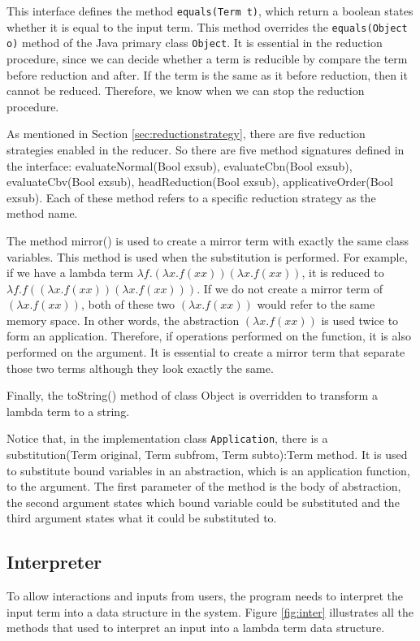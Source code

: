 This interface defines the method \verb|equals(Term t)|, which return a boolean states whether it is equal to the input term. This method overrides the \verb|equals(Object o)| method of the Java primary class \verb|Object|. It is essential in the reduction procedure, since we can decide whether a term is reducible by compare the term before reduction and after. If the term is the same as it before reduction, then it cannot be reduced. Therefore, we know when we can stop the reduction procedure.  

As mentioned in Section \ref{sec:reductionstrategy}, there are five reduction strategies enabled in the reducer. So there are five method signatures defined in the interface: \textsf{evaluateNormal(Bool exsub), evaluateCbn(Bool exsub), evaluateCbv(Bool exsub), headReduction(Bool exsub), applicativeOrder(Bool exsub)}. Each of these method refers to a specific reduction strategy as the method name. 

The method \textsf{mirror()} is used to create a mirror term with exactly the same class variables. This method is used when the substitution is performed. For example, if we have a lambda term $\lambda f.(\lambda x.f(xx))(\lambda x.f(xx))$, it is reduced to $\lambda f.f((\lambda x.f(xx))(\lambda x.f(xx)))$. If we do not create a mirror term of $(\lambda x.f(xx))$, both of these two $(\lambda x.f(xx))$ would refer to the same memory space. In other words, the abstraction $(\lambda x.f(xx))$ is used twice to form an application. Therefore, if operations performed on the function, it is also performed on the argument. It is essential to create a mirror term that separate those two terms although they look exactly the same.      

Finally, the \textsf{toString()} method of class \textsf{Object} is overridden to transform a lambda term to a string. 

Notice that, in the implementation class \verb|Application|, there is a \textsf{substitution(Term original, Term subfrom, Term subto):Term} method. It is used to substitute bound variables in an abstraction, which is an application function, to the argument. The first parameter of the method is the body of abstraction, the second argument states which bound variable could be substituted and the third argument states what it could be substituted to.

\subsection{Interpreter}
To allow interactions and inputs from users, the program needs to interpret the input term into a data structure in the system. Figure \ref{fig:inter} illustrates all the methods that used to interpret an input into a lambda term data structure.   

